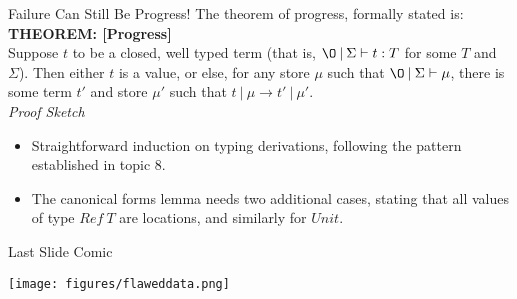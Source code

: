 \documentclass[11pt]{beamer}
\begin{document}
\begin{frame}[fragile=singleslide]{Failure Can Still Be Progress!}
The theorem of progress, formally stated is: \\ 
\vspace{1em}
\textbf{THEOREM: [Progress]} \\ 
Suppose $t$ to be a closed, well typed term (that is, $\O \:|\: \Sigma \vdash t : T$ for some $T$ and $\Sigma$).  Then either $t$ is a value, or else, for any store $\mu$ such that $\O \:|\:\Sigma \vdash \mu$, there is some term $t'$ and store $\mu'$ such that $t\:|\:\mu \rightarrow t'\:|\:\mu'$. \\
\vspace{1em}
\emph{Proof Sketch}
\begin{itemize}
\item Straightforward induction on typing derivations, following the pattern established in topic 8.  
\item The canonical forms lemma needs two additional cases, stating that all values of type $Ref\:T$ are locations, and similarly for $Unit$.
\end{itemize}
\end{frame}


\begin{frame}[fragile=singleslide]{Last Slide Comic}
\begin{center}
\texttt{[image: figures/flaweddata.png]}
\end{center}
\end{frame}
\end{document}
